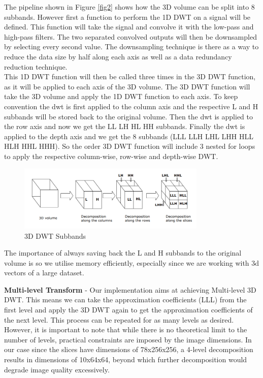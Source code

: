 \documentclass{article}
\begin{document}
The pipeline shown in Figure \ref{fig2} shows how the 3D volume can be split into 8 subbands. However first a function to perform the 1D DWT on a signal will be defined. This function will take the signal and convolve it with the low-pass and high-pass filters. The two separated convolved outputs will then be downsampled by selecting every second value. The downsampling technique is there as a way to reduce the data size by half along each axis as well as a data redundancy reduction technique.\\

This 1D DWT function will then be called three times in the 3D DWT function, as it will be applied to each axis of the 3D volume. The 3D DWT function will take the 3D volume and apply the 1D DWT function to each axis. To keep convention the dwt is first applied to the column axis and the respective L and H subbands will be stored back to the original volume. Then the dwt is applied to the row axis and now we get the LL LH HL HH subbands. Finally the dwt is applied to the depth axis and we get the 8 subbands (LLL LLH LHL LHH HLL HLH HHL HHH). So the order 3D DWT function will include 3 nested for loops to apply the respective column-wise, row-wise and depth-wise DWT.\\

\begin{figure}[H]
    \centering
    \includegraphics[width=0.8\textwidth]{assets/subbands.png}
    \caption{3D DWT Subbands \cite{Prochazka2011}}
    \label{fig3}
\end{figure}

The importance of always saving back the L and H subbands to the original volume is so we utilise memory efficiently, especially since we are working with 3d vectors of a large dataset.

\textbf{Multi-level Transform} - Our implementation aims at achieving Multi-level 3D DWT. This means we can take the approximation coefficients (LLL) from the first level and apply the 3D DWT again to get the approximation coefficients of the next level. This process can be repeated for as many levels as desired. However, it is important to note that while there is no theoretical limit to the number of levels, practical constraints are imposed by the image dimensions. In our case since the slices have dimensions of 78x256x256, a 4-level decomposition results in dimensions of 10x64x64, beyond which further decomposition would degrade image quality excessively.\\
\end{document}
